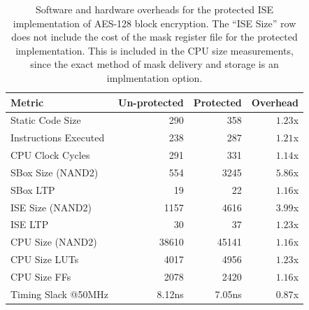\begin{table}[]
\centering
\begin{tabular}{lrrr}
Metric  & Un-protected & Protected  & Overhead \\
\hline
Static Code Size      & 290                  & 358    & $1.23$x        \\
Instructions Executed & 238                  & 287    & $1.21$x        \\
CPU Clock Cycles      & 291                  & 331    & $1.14$x        \\
SBox Size (NAND2)     & 554                  & 3245   & $5.86$x        \\
SBox LTP              & 19                   & 22     & $1.16$x        \\
ISE Size (NAND2)      & 1157                 & 4616   & $3.99$x        \\
ISE LTP               & 30                   & 37     & $1.23$x        \\
CPU Size (NAND2)      & 38610                & 45141  & $1.16$x        \\
CPU Size  LUTs        & 4017                 & 4956   & $1.23$x        \\
CPU Size  FFs         & 2078                 & 2420   & $1.16$x        \\
Timing Slack @50MHz   & 8.12ns               & 7.05ns & $0.87$x
\end{tabular}
\caption{
Software and hardware overheads for the protected ISE implementation
of AES-128 block encryption.
The ``ISE Size'' row does not include the cost of the mask register file
for the protected implementation.
This is included in the CPU size measurements, since the exact method
of mask delivery and storage is an implmentation option.
}
\label{tab:sca:sw-hw}
\end{table}

